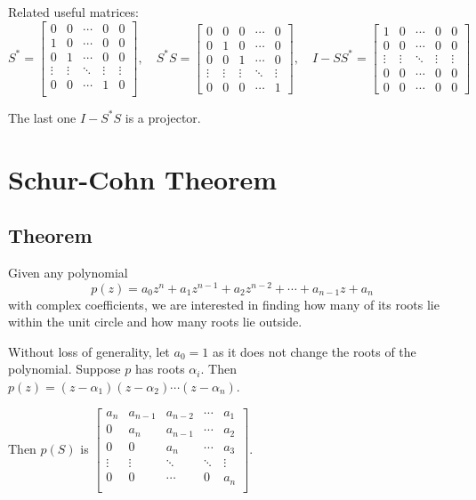 \documentclass[twofold]{article}
\newcommand*\adj[1]{#1^*}
\theoremstyle{plain}
\theoremstyle{definition}
\theoremstyle{remark}
\begin{document}
Related useful matrices: 
\[\adj{S} =  \begin{bmatrix} 
0 & 0 & \cdots & 0 & 0 \\
1 & 0 & \cdots & 0 & 0 \\
0 & 1 & \cdots & 0 & 0 \\
\vdots & \vdots & \ddots &\vdots & \vdots \\
0 & 0 & \cdots & 1 & 0 \\ 
\end{bmatrix}, \quad 
\adj{S} S  =  \begin{bmatrix} 
0 & 0 & 0 & \cdots & 0 \\
0 & 1 & 0 & \cdots & 0 \\
0 & 0 & 1 & \cdots & 0 \\
\vdots & \vdots & \vdots & \ddots & \vdots \\
0 & 0 & 0 & \cdots & 1
\end{bmatrix}, \quad 
 I - S \adj{S} =  \begin{bmatrix} 
1 & 0 & \cdots & 0 & 0 \\
0 & 0 & \cdots & 0 & 0 \\
\vdots & \vdots & \ddots &\vdots & \vdots \\
0 & 0 & \cdots & 0 & 0 \\ 
0 & 0 & \cdots & 0 & 0
\end{bmatrix}\]

The last one \(I - \adj{S} S\) is a projector. 


\section{Schur-Cohn Theorem}

\subsection{Theorem}
Given any polynomial \[p(z) = a_0 z^n + a_1z^{n-1} + a_2 z^{n-2} + \cdots +  a_{n-1} z + a_n\] with complex coefficients, we are interested in finding how many of its roots lie within the unit circle and how many roots lie outside.

 Without loss of generality, let \(a_0 = 1\) as it does not change the roots of the polynomial. Suppose \(p\) has roots \(\alpha_i\). Then \(p(z) = (z - \alpha_1) (z - \alpha_2) \cdots (z - \alpha_n)\). 

 Then \(p(S) \) is \( \begin{bmatrix} 

a_n & a_{n-1} & a_{n-2} & \cdots & a_1 \\
0 & a_n & a_{n-1} & \cdots & a_2 \\
0 & 0 & a_n & \cdots & a_3 \\
\vdots & \vdots & \ddots &\ddots & \vdots \\
0 & 0 & \cdots & 0 & a_n \\ 
\end{bmatrix}\). 
\end{document}
